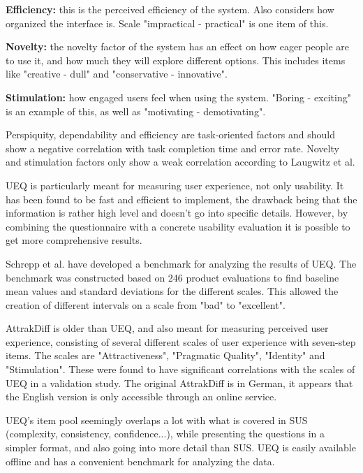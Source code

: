 \textbf{Efficiency:} this is the perceived efficiency of the system. Also considers how organized the interface is. Scale "impractical - practical" is one item of this.

\textbf{Novelty:} the novelty factor of the system has an effect on how eager people are to use it, and how much they will explore different options. This includes items like "creative - dull" and "conservative - innovative".

\textbf{Stimulation:} how engaged users feel when using the system. "Boring - exciting" is an example of this, as well as "motivating - demotivating".

Perspiquity, dependability and efficiency are task-oriented factors and should show a negative correlation with task completion time and error rate. Novelty and stimulation factors only show a weak correlation according to Laugwitz et al. \cite{laugwitz2008construction}

UEQ is particularly meant for measuring user experience, not only usability. It has been found to be fast and efficient to implement, the drawback being that the information is rather high level and doesn't go into specific details. However, by combining the questionnaire with a concrete usability evaluation it is possible to get more comprehensive results. \cite{schrepp2014applying, rauschenberger2013efficient}

Schrepp et al. have developed a benchmark for analyzing the results of UEQ. The benchmark was constructed based on 246 product evaluations to find baseline mean values and standard deviations for the different scales. This allowed the creation of different intervals on a scale from "bad" to "excellent". \cite{schrepp2017construction}

AttrakDiff is older than UEQ, and also meant for measuring perceived user experience, consisting of several different scales of user experience with seven-step items. The scales are "Attractiveness", "Pragmatic Quality", "Identity" and "Stimulation". These were found to have significant correlations with the scales of UEQ in a validation study. \cite{laugwitz2008construction} The original AttrakDiff is in German, it appears that the English version is only accessible through an online service. \cite{attrakdiff}

UEQ's item pool seemingly overlaps a lot with what is covered in SUS (complexity, consistency, confidence...), while presenting the questions in a simpler format, and also going into more detail than SUS. UEQ is easily available offline and has a convenient benchmark for analyzing the data.